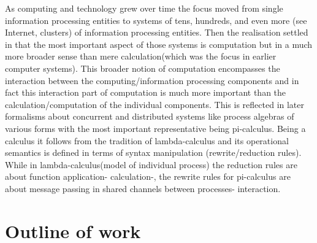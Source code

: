 As computing and
technology grew over time the focus moved from single information
processing entities to systems of tens, hundreds, and even more (see
Internet, clusters) of information processing entities. Then the
realisation settled in that the most important aspect of those systems
is computation but in a much more broader sense than mere
calculation(which was the focus in earlier computer systems). This
broader notion of computation encompasses the interaction between the
computing/information processing components and in fact this
interaction part of computation is much more important than the
calculation/computation of the individual components. This is
reflected in later formalisms about concurrent and distributed systems
like process algebras of various forms with the most important
representative being pi-calculus. Being a calculus it follows from the
tradition of lambda-calculus and its operational semantics is defined in
terms of syntax manipulation (rewrite/reduction rules). While in
lambda-calculus(model of individual process) the reduction rules are
about function application- calculation-, the rewrite rules for
pi-calculus are about message passing in shared channels between
processes- interaction.




\section{Outline of work}